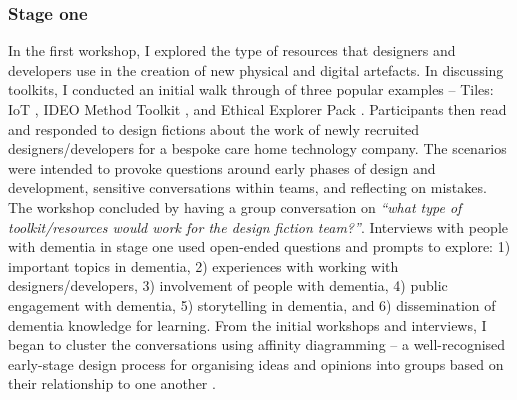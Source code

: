 \subsubsection{Stage one}
In the first workshop, I explored the type of resources that designers and developers use in the creation of new physical and digital artefacts. In discussing toolkits, I conducted an initial walk through of three popular examples – Tiles: IoT \citep{mora2017tiles}, IDEO Method Toolkit \citep{fraga2020inclusive}, and Ethical Explorer Pack \citep{network_ethical_nodate}. Participants then read and responded to design fictions about the work of newly recruited designers/developers for a bespoke care home technology company. The scenarios were intended to provoke questions around early phases of design and development, sensitive conversations within teams, and reflecting on mistakes. The workshop concluded by having a group conversation on \textit{“what type of toolkit/resources would work for the design fiction team?”}.
Interviews with people with dementia in stage one used open-ended questions and prompts to explore: 1) important topics in dementia, 2) experiences with working with designers/developers, 3) involvement of people with dementia, 4) public engagement with dementia, 5) storytelling in dementia, and 6) dissemination of dementia knowledge for learning.
From the initial workshops and interviews, I began to cluster the conversations using affinity diagramming – a well-recognised early-stage design process for organising ideas and opinions into groups based on their relationship to one another \citep{lucero2015using}. 



